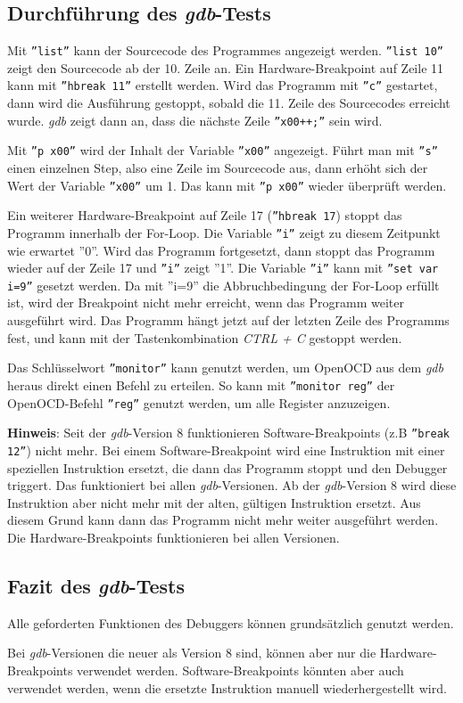\subsection{Durchführung des \textit{gdb}-Tests}
Mit \texttt{''list''} kann der Sourcecode des Programmes angezeigt werden.
\texttt{''list 10''} zeigt den Sourcecode ab der 10. Zeile an.
Ein Hardware-Breakpoint auf Zeile 11 kann mit \texttt{''hbreak 11''} erstellt werden.
Wird das Programm mit \texttt{''c''} gestartet, dann wird die Ausführung gestoppt, sobald die 11. Zeile des Sourcecodes erreicht wurde.
\textit{gdb} zeigt dann an, dass die nächste Zeile \texttt{''x00++;''} sein wird.

Mit \texttt{''p x00''} wird der Inhalt der Variable \texttt{''x00''} angezeigt.
Führt man mit \texttt{''s''} einen einzelnen Step, also eine Zeile im Sourcecode aus, dann erhöht sich der Wert der Variable \texttt{''x00''} um 1.
Das kann mit \texttt{''p x00''}  wieder überprüft werden.


Ein weiterer Hardware-Breakpoint auf Zeile 17 (\texttt{''hbreak 17}) stoppt das Programm innerhalb der For-Loop.
Die Variable \texttt{''i''} zeigt zu diesem Zeitpunkt wie erwartet ''0''.
Wird das Programm fortgesetzt, dann stoppt das Programm wieder auf der Zeile 17 und \texttt{''i''} zeigt ''1''.
Die Variable \texttt{''i''} kann mit \texttt{''set var i=9''} gesetzt werden.
Da mit ''i=9'' die Abbruchbedingung der For-Loop erfüllt ist, wird der Breakpoint nicht mehr erreicht, wenn das Programm weiter ausgeführt wird.
Das Programm hängt jetzt auf der letzten Zeile des Programms fest, und kann mit der Tastenkombination \textit{CTRL + C} gestoppt werden.

Das Schlüsselwort \texttt{''monitor''} kann genutzt werden, um OpenOCD aus dem \textit{gdb} heraus direkt einen Befehl zu erteilen.
So kann mit \texttt{''monitor reg''} der OpenOCD-Befehl \texttt{''reg''} genutzt werden, um alle Register anzuzeigen.

\textbf{Hinweis}: 
Seit der \textit{gdb}-Version 8 funktionieren Software-Breakpoints (z.B \texttt{''break 12''}) nicht mehr.
Bei einem Software-Breakpoint wird eine Instruktion mit einer speziellen Instruktion ersetzt, die dann das Programm stoppt und den Debugger triggert.
Das funktioniert bei allen \textit{gdb}-Versionen.
Ab der \textit{gdb}-Version 8 wird diese Instruktion aber nicht mehr mit der alten, gültigen Instruktion ersetzt.
Aus diesem Grund kann dann das Programm nicht mehr weiter ausgeführt werden.
Die Hardware-Breakpoints funktionieren bei allen Versionen.


\subsection{Fazit des \textit{gdb}-Tests}
Alle geforderten Funktionen des Debuggers können grundsätzlich genutzt werden.

Bei \textit{gdb}-Versionen die neuer als Version 8 sind, können aber nur die Hardware-Breakpoints verwendet werden.
Software-Breakpoints könnten aber auch verwendet werden, wenn die ersetzte Instruktion manuell wiederhergestellt wird.



